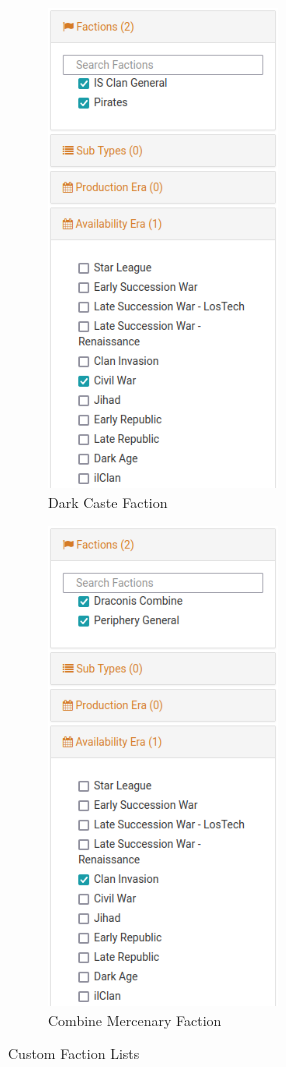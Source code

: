 \begin{figure}[!h]
  \centering
  \begin{subfigure}{0.4\textwidth}
    \centering
    \includegraphics[height=5.0in,width=2.4in]{img/Dark_Caste_List.png}
    \caption*{Dark Caste Faction}
  \end{subfigure}
  \hspace{1in}
  \begin{subfigure}{0.4\textwidth}
    \centering
    \includegraphics[height=5.0in,width=2.4in]{img/Combine_Mercenary_List.png}
    \caption*{Combine Mercenary Faction}
  \end{subfigure}
  \caption*{Custom Faction Lists}
\end{figure}
